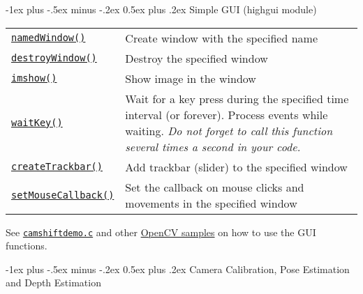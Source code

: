 \documentclass[10pt,landscape]{article}
\makeatletter
\renewcommand{\section}{\@startsection{section}{1}{0mm}%
                                {-1ex plus -.5ex minus -.2ex}%
                                {0.5ex plus .2ex}%
                                {\normalfont\large\bfseries}}
\makeatother
\begin{document}
\begin{multicols}{3}
\section{Simple GUI (highgui module)}

\begin{tabular}{@{}p{\the\MyLen}%
                @{}p{\linewidth-\the\MyLen}@{}}

\texttt{\href{http://opencv.willowgarage.com/documentation/cpp/user_interface.html\#cv-namedwindow}{namedWindow()}} & Create window with the specified name \\

\texttt{\href{http://opencv.willowgarage.com/documentation/cpp/user_interface.html\#cv-destroywindow}{destroyWindow()}} & Destroy the specified window \\

\texttt{\href{http://opencv.willowgarage.com/documentation/cpp/user_interface.html\#cv-imshow}{imshow()}} & Show image in the window \\

\texttt{\href{http://opencv.willowgarage.com/documentation/cpp/user_interface.html\#cv-waitKey}{waitKey()}} & Wait for a key press during the specified time interval (or forever). Process events while waiting. \emph{Do not forget to call this function several times a second in your code.} \\

\texttt{\href{http://opencv.willowgarage.com/documentation/cpp/user_interface.html\#cv-createTrackbar}{createTrackbar()}} & Add trackbar (slider) to the specified window \\

\texttt{\href{http://opencv.willowgarage.com/documentation/cpp/user_interface.html\#cv-setmousecallback}{setMouseCallback()}} & Set the callback on mouse clicks and movements in the specified window \\

\end{tabular}

See \texttt{\href{https://code.ros.org/svn/opencv/trunk/opencv/samples/c/camshiftdemo.c}{camshiftdemo.c}} and other \href{https://code.ros.org/svn/opencv/trunk/opencv/samples/}{OpenCV samples} on how to use the GUI functions.   

\section{Camera Calibration, Pose Estimation and Depth Estimation}


\end{multicols}
\end{document}
